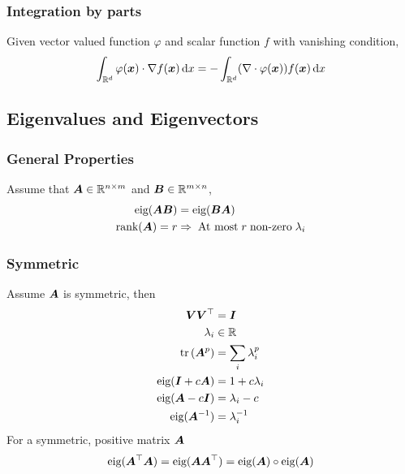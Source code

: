 \documentclass[10pt]{article}
\begin{document}
\subsubsection{Integration by parts}
Given vector valued function $\varphi$ and scalar function $f$ with vanishing condition, 
\begin{equation}
    \int_{\mathbb{R}^d} {\varphi ({\bm{x}}) \cdot \nabla f ({\bm{x}}) \,\mathrm{d}x} = - \int_{\mathbb{R}^d} (\nabla \cdot \varphi({\bm{x}})) f({\bm{x}}) \,\mathrm{d}x  
\end{equation}
\subsection{Eigenvalues and Eigenvectors}
\subsubsection{General Properties}
Assume that ${\bm{A}} \in \mathbb{R}^{n \times m}$ and ${\bm{B}} \in \mathbb{R}^{m  \times n }$, 
\begin{align}
    \text{eig}({\bm{A}}{\bm{B}}) &= \text{eig}({\bm{B}}{\bm{A}}) \\ 
    \text{rank}({\bm{A}}) = r& \Rightarrow  \text{\;At most\;} r \text{\;non-zero\;} \lambda_i 
\end{align}
\subsubsection{Symmetric}
Assume ${\bm{A}}$ is symmetric, then 
\begin{align}
    {\bm{V}} {\bm{V}}^{\top} &= {\bm{I}}  \\ 
    \lambda_i &\in \mathbb{R} \\ 
    \mathrm{tr}\,({\bm{A}}^p) &= \sum_i \lambda_i^p \\
    \text{eig}({\bm{I}} + c {\bm{A}}) &= 1 + c \lambda_i \\ 
    \text{eig}({\bm{A}} - c{\bm{I}}) &= \lambda_i -c \\ 
    \text{eig}({\bm{A}}^{-1}) &= \lambda_i^{-1} 
\end{align}
For a symmetric, positive matrix ${\bm{A}}$ 
\begin{equation}
    \text{eig}({\bm{A}}^{\top}{\bm{A}}) = \text{eig}({\bm{A}} {\bm{A}}^{\top}) = \text{eig}({\bm{A}}) \circ \text{eig}({\bm{A}}) 
\end{equation}
\end{document}
